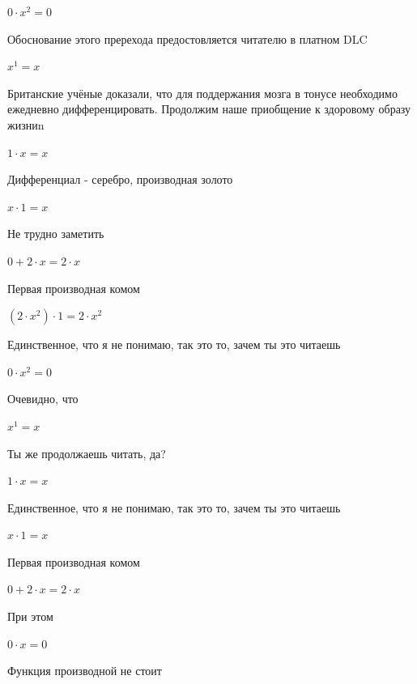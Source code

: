 \documentclass[12pt,a4paper,fleqn]{article}
\begin{document}
\begin{center}
$0 \cdot x^{2} = 0$\end{center}
Обоснование этого пререхода предостовляется читателю в платном DLC

\begin{center}
$x^{1} = x$\end{center}
Британские учёные доказали, что для поддержания мозга в тонусе необходимо ежедневно дифференцировать. Продолжим наше приобщение к здоровому образу жизниn

\begin{center}
$1 \cdot x = x$\end{center}
Дифференциал - серебро, производная золото\cite{link2}

\begin{center}
$x \cdot 1 = x$\end{center}
Не трудно заметить

\begin{center}
$0+2 \cdot x = 2 \cdot x$\end{center}
Первая производная комом\cite{link2}

\begin{center}
$(2 \cdot x^{2}) \cdot 1 = 2 \cdot x^{2}$\end{center}
Единственное, что я не понимаю, так это то, зачем ты это читаешь

\begin{center}
$0 \cdot x^{2} = 0$\end{center}
Очевидно, что

\begin{center}
$x^{1} = x$\end{center}
Ты же продолжаешь читать, да?

\begin{center}
$1 \cdot x = x$\end{center}
Единственное, что я не понимаю, так это то, зачем ты это читаешь

\begin{center}
$x \cdot 1 = x$\end{center}
Первая производная комом\cite{link2}

\begin{center}
$0+2 \cdot x = 2 \cdot x$\end{center}
При этом

\begin{center}
$0 \cdot x = 0$\end{center}
Функция производной не стоит\cite{link2}
\end{document}
